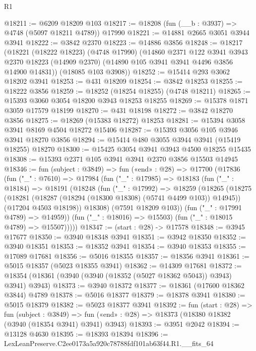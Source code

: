 \begin{lexlean}{R1}
\begin{coremodule}
@18211 := @6209 @18209 @103
@18217 := @18208 (fun (__b : @3937) => @4748 (@5097 @18211 @4789)) @17990
@18221 := @14881 @2665 @3051 @3944 @3941
@18222 := @3842 @2370
@18223 := @14886 @3856
@18248 := @18217
    (@18221
      (@18222 @18223)
      (@4748 @17990)
      (@14860
        @2371
        @122
        @3941
        @3943
        @2370
        @18223
        (@14909 @2370)
        (@14890 @105 @3941 @3941 @4496 @3856 @14900 @14831))
      (@18085 @103 @3908))
@18252 := @15414 @293 @3062 @18202 @3941
@18253 := @431 @18209
@18254 := @3842 @18253
@18255 := @18222 @3856
@18259 := @18252 (@18254 @18255) (@4748 @18211)
@18265 := @15393 @3060 @3054 @18200 @3943 @18253 @18255
@18269 := @15378 @1871 @3059 @17579 @18199
@18270 := @431 @18198
@18272 := @3842 @18270 @3856
@18275 := @18269 (@15383 @18272) @18253
@18281 := @15394 @3058 @3941 @8169 @4504 @18272 @15406
@18287 := @15393 @3056 @105 @3946 @3941 @18270 @3856
@18294 := @15414 @480 @3055 @3944 @3941 (@15419 @18255) @18270
@18300 := @15425 @3054 @3941 @3943 @4500 @18255 @15435
@18308 := @15393 @2371 @105 @3941 @3941 @2370 @3856 @15503 @14945
@18346 := fun (subject : @3849) =>
  fun («end» : @28) =>
  @17700
    (@17836
      (fun ("_" : @7610) =>
      @17984
        (fun ("_" : @17985) =>
        @18183
          (fun ("_" : @18184) =>
          @18191
            (@18248
              (fun ("_" : @17992) =>
              @18259
                (@18265
                  (@18275
                    (@18281 (@18287 (@18294 (@18300 @18308) (@5741 @4499 @103)) @14945))
                    (@17204 @4503 @18198))
                  @18308)
                (@7591 @18209 @103))
              (fun ("_" : @17991 @4789) => @14959))
            (fun ("_" : @18016) => @15503)
            (fun ("_" : @18015 @4789) => @15507)))))
@18347 := (start : @28) -> @17578
@18348 := @3945 @17677
@18350 := @3940 @18348 @3941
@18351 := @3942 @18350
@18352 := @3940 @18351
@18353 := @18352 @3941
@18354 := @3940 @18353
@18355 := @17089 @17681
@18356 := @5016 @18355
@18357 := @18356 @3941
@18361 := @5015 @18357 (@5023 @18355 @3941)
@18362 := @14309 @17681
@18372 := @18354 (@18361 (@3940 (@3940 (@18352 (@5027 @18362 @5043)) @3943) @3941) @3943)
@18373 := @3940 @18372
@18377 := @18361 (@17600 @18362 @3844) @4789
@18378 := @5016 @18377
@18379 := @18378 @3941
@18380 := @5015 @18379
@18382 := @5023 @18377 @3941
@18392 := fun (start : @28) =>
  fun (subject : @3849) =>
  fun («end» : @28) => @18373 (@18380 @18382 (@3940 (@18354 @3941) @3941) @3943)
@18393 := @3951 @2042
@18394 := @13128 @4630
@18395 := @18393 @18394
@18396 := LexLeanPreserve.C2ee0173a5a920c78788fdf101ab63f44.R1.__fits_64

\end{coremodule}
\end{lexlean}
